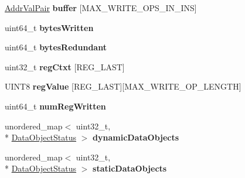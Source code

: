 \begin{DoxyCompactItemize}
\item 
\hypertarget{structRedSpyThreadData_a742275c039a4aac95677a50c14c31071}{\hyperlink{structAddrValPair}{Addr\-Val\-Pair} {\bfseries buffer} \mbox{[}M\-A\-X\-\_\-\-W\-R\-I\-T\-E\-\_\-\-O\-P\-S\-\_\-\-I\-N\-\_\-\-I\-N\-S\mbox{]}}\label{structRedSpyThreadData_a742275c039a4aac95677a50c14c31071}

\item 
\hypertarget{structRedSpyThreadData_a1e5f7f3d2dff39d146bfd998437dc5ce}{uint64\-\_\-t {\bfseries bytes\-Written}}\label{structRedSpyThreadData_a1e5f7f3d2dff39d146bfd998437dc5ce}

\item 
\hypertarget{structRedSpyThreadData_aaef802b94eb3d105b589828742f587ac}{uint64\-\_\-t {\bfseries bytes\-Redundant}}\label{structRedSpyThreadData_aaef802b94eb3d105b589828742f587ac}

\item 
\hypertarget{structRedSpyThreadData_ae037db3b48bfee05ab1142d1b29e2ee5}{uint32\-\_\-t {\bfseries reg\-Ctxt} \mbox{[}R\-E\-G\-\_\-\-L\-A\-S\-T\mbox{]}}\label{structRedSpyThreadData_ae037db3b48bfee05ab1142d1b29e2ee5}

\item 
\hypertarget{structRedSpyThreadData_aef0c04703b8f30f19de9168520902261}{U\-I\-N\-T8 {\bfseries reg\-Value} \mbox{[}R\-E\-G\-\_\-\-L\-A\-S\-T\mbox{]}\mbox{[}M\-A\-X\-\_\-\-W\-R\-I\-T\-E\-\_\-\-O\-P\-\_\-\-L\-E\-N\-G\-T\-H\mbox{]}}\label{structRedSpyThreadData_aef0c04703b8f30f19de9168520902261}

\item 
\hypertarget{structRedSpyThreadData_ac6ab8508dc5d0454c04591613b7ac69f}{uint64\-\_\-t {\bfseries num\-Reg\-Written}}\label{structRedSpyThreadData_ac6ab8508dc5d0454c04591613b7ac69f}

\item 
\hypertarget{structRedSpyThreadData_a069952ae89ec0cab991f3d6ed452c1f3}{unordered\-\_\-map$<$ uint32\-\_\-t, \\*
\hyperlink{structdataObjectStatus}{Data\-Object\-Status} $>$ {\bfseries dynamic\-Data\-Objects}}\label{structRedSpyThreadData_a069952ae89ec0cab991f3d6ed452c1f3}

\item 
\hypertarget{structRedSpyThreadData_a31b9779ab16ab0f2acdc278b7c7da115}{unordered\-\_\-map$<$ uint32\-\_\-t, \\*
\hyperlink{structdataObjectStatus}{Data\-Object\-Status} $>$ {\bfseries static\-Data\-Objects}}\label{structRedSpyThreadData_a31b9779ab16ab0f2acdc278b7c7da115}


\end{DoxyCompactItemize}
